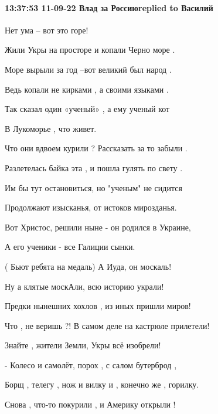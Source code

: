 

\paragraph{13:37:53 11-09-22 Влад за Россиюreplied to Василий}

 Нет ума – вот это горе!

 Жили Укры на просторе и копали Черно море .

 Море вырыли за год –вот великий был народ .

	Ведь копали не кирками , а своими языками .

	Так сказал один «ученый» , а ему ученый кот 

	В Лукоморье , что живет.

	Что они вдвоем курили ? Рассказать за то забыли .

	Разлетелась байка эта , и пошла гулять по свету .

	Им бы тут остановиться, но "ученым" не сидится 

Продолжают изысканья, от истоков мирозданья.

Вот Христос, решили ныне - он родился в Украине,

А его ученики - все Галиции сынки.

( Бьют ребята на медаль) А Иуда, он москаль!

Ну а клятые москАли, всю историю украли!

 Предки нынешних хохлов , из иных пришли миров!

Что , не веришь ?! В самом деле на кастрюле прилетели!

Знайте , жители Земли, Укры всё изобрели!

 - Колесо и самолёт, порох , с салом бутерброд ,

Борщ , телегу , нож и вилку и , конечно же , горилку.

Снова , что-то покурили , и Америку открыли !

